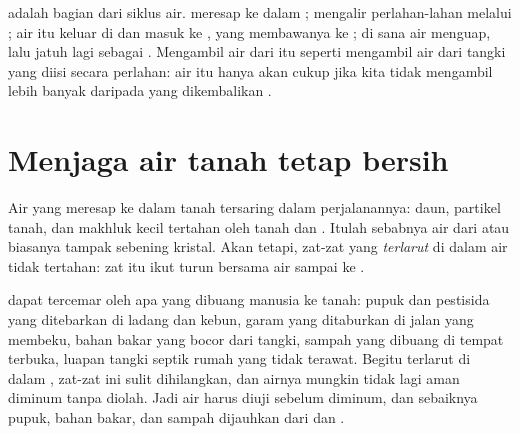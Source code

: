  adalah bagian dari siklus air.  meresap ke dalam ;  mengalir perlahan-lahan melalui ; air itu keluar di 
dan masuk ke , yang membawanya ke ; di sana air menguap, lalu
jatuh lagi sebagai . Mengambil air dari  itu seperti mengambil
air dari tangki yang diisi  secara perlahan: air itu hanya akan cukup
jika kita tidak mengambil lebih banyak daripada yang dikembalikan .

\section{Menjaga air tanah tetap bersih}

Air yang meresap ke dalam tanah tersaring dalam perjalanannya: daun,
partikel tanah, dan makhluk kecil tertahan oleh tanah dan . Itulah
sebabnya air dari  atau  biasanya tampak sebening kristal.
Akan tetapi, zat-zat yang \emph{terlarut} di dalam air tidak tertahan: zat
itu ikut turun bersama air sampai ke .

 dapat tercemar oleh apa yang dibuang manusia ke tanah: pupuk dan
pestisida yang ditebarkan di ladang dan kebun, garam yang ditaburkan di
jalan yang membeku, bahan bakar yang bocor dari tangki, sampah yang dibuang
di tempat terbuka, luapan tangki septik rumah yang tidak terawat. Begitu
terlarut di dalam , zat-zat ini sulit dihilangkan, dan airnya mungkin
tidak lagi aman diminum tanpa diolah. Jadi air  harus diuji sebelum
diminum, dan sebaiknya pupuk, bahan bakar, dan sampah dijauhkan dari 
dan .

